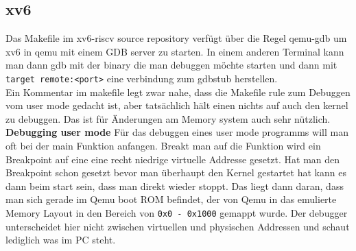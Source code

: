 
\subsection{xv6}
Das Makefile im xv6-riscv source repository verfügt über die Regel qemu-gdb um xv6 in qemu
mit einem GDB server zu starten. In einem anderen Terminal kann man dann gdb mit der binary
die man debuggen möchte starten und dann mit \texttt{target remote:<port>} eine verbindung
zum gdbstub herstellen.\\
Ein Kommentar im makefile legt zwar nahe, dass die Makefile rule zum Debuggen vom user mode
gedacht ist, aber tatsächlich hält einen nichts auf auch den kernel zu debuggen. Das ist
für Änderungen am Memory system auch sehr nützlich.\\
\textbf{Debugging user mode} Für das debuggen eines user mode programms will man oft bei
der main Funktion anfangen. Breakt man auf die Funktion wird ein Breakpoint auf eine eine recht
niedrige virtuelle Addresse gesetzt. Hat man den Breakpoint schon gesetzt bevor man überhaupt
den Kernel gestartet hat kann es dann beim start sein, dass man direkt wieder stoppt.
Das liegt dann daran, dass man sich gerade im Qemu boot ROM befindet, der von Qemu in
das emulierte Memory Layout in den Bereich von \texttt{0x0 - 0x1000} gemappt wurde.
Der debugger unterscheidet hier nicht zwischen virtuellen und physischen Addressen und
schaut lediglich was im PC steht.


